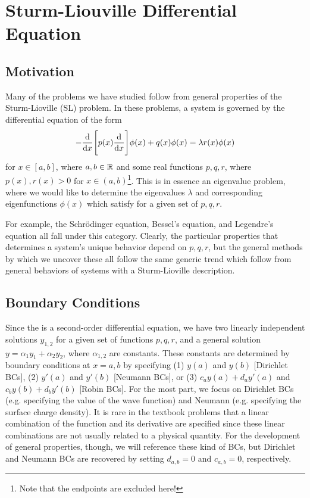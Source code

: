 \chapter{Sturm-Liouville Differential Equation}

\section{Motivation}

Many of the problems we have studied follow from general properties of the Sturm-Lioville (SL) problem.
In these problems, a system is governed by the differential equation of the form 
\begin{eqnarray}
    \label{eq:SL-DE}
    -\dv{x}\Bigg[ p(x) \dv{x} \Bigg] \phi(x) + q(x) \phi(x) =  \lambda r(x) \phi(x)
\end{eqnarray}
for $x \in [a,b]$, where $a,b \in \mathbb{R}$ and some real functions $p,q,r$, where $p(x),r(x) > 0$ for $x \in (a,b)$\footnote{Note that the endpoints are excluded here!}.
This is in essence an eigenvalue problem, where we would like to determine the eigenvalues $\lambda$ and corresponding eigenfunctions $\phi(x)$ which satisfy  for a given set of $p,q,r$.

For example, the Schr\"{o}dinger equation, Bessel's equation, and Legendre's equation all fall under this category.
Clearly, the particular properties that determines a system's unique behavior depend on $p,q,r$, but the general methods by which we uncover these all follow the same generic trend which follow from general behaviors of systems with a Sturm-Lioville description.


\section{Boundary Conditions}

Since the  is a second-order differential equation, we have two linearly independent solutions $y_{1,2}$ for a given set of functions $p,q,r$, and a general solution $y = \alpha_1 y_1 + \alpha_2 y_2$, where $\alpha_{1,2}$ are constants.
These constants are determined by boundary conditions at $x=a,b$ by specifying (1) $y(a)$ and $y(b)$ [Dirichlet BCs], (2) $y'(a)$ and $y'(b)$ [Neumann BCs], or (3) $c_a y(a) + d_{a} y'(a)$ and $c_{b} y(b) + d_{b}y'(b)$ [Robin BCs].
For the most part, we focus on Dirichlet BCs (e.g. specifying the value of the wave function) and Neumann (e.g. specifying the surface charge density).
It is rare in the textbook problems that a linear combination of the function and its derivative are specified since these linear combinations are not usually related to a physical quantity.
For the development of general properties, though, we will reference these kind of BCs, but Dirichlet and Neumann BCs are recovered by setting $d_{a,b} = 0$ and $c_{a,b} = 0$, respectively.

